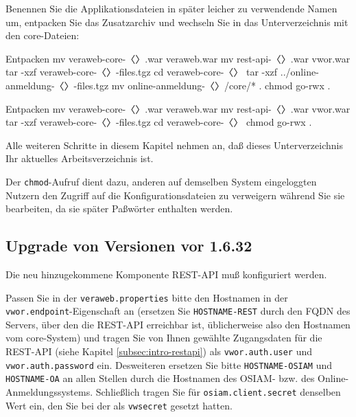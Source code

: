 \begin{minipage}{\linewidth}
Benennen Sie die Applikationsdateien in später leicher zu
verwendende Namen um, entpacken Sie das Zusatzarchiv und
wechseln Sie in das Unterverzeichnis mit den core-Dateien:

\ifoa
\begin{lstdump}{Entpacken}
mv veraweb-core-〈\lstdumpesc{\vwiaverssw}〉.war veraweb.war
mv rest-api-〈\lstdumpesc{\vwiaverssw}〉.war vwor.war
tar -xzf veraweb-core-〈\lstdumpesc{\vwiaverssw}〉-files.tgz
cd veraweb-core-〈\lstdumpesc{\vwiaverssw}〉
tar -xzf ../online-anmeldung-〈\lstdumpesc{\vwiaverssw}〉-files.tgz
mv online-anmeldung-〈\lstdumpesc{\vwiaverssw}〉/core/* .
chmod go-rwx .
\end{lstdump}
\else%
\begin{lstdump}{Entpacken}
mv veraweb-core-〈\lstdumpesc{\vwiaverssw}〉.war veraweb.war
mv rest-api-〈\lstdumpesc{\vwiaverssw}〉.war vwor.war
tar -xzf veraweb-core-〈\lstdumpesc{\vwiaverssw}〉-files.tgz
cd veraweb-core-〈\lstdumpesc{\vwiaverssw}〉
chmod go-rwx .
\end{lstdump}
\fi%
\end{minipage}

Alle weiteren Schritte in diesem Kapitel nehmen an, daß dieses
Unterverzeichnis Ihr aktuelles Arbeitsverzeichnis ist.

Der \texttt{chmod}-Aufruf dient dazu, anderen auf demselben System
eingeloggten Nutzern den Zugriff auf die Konfigurationsdateien zu
verweigern während Sie sie bearbeiten, da sie später Paßwörter
enthalten werden.

\subsection{Upgrade von Versionen vor 1.6.32}\label{subsec:upgrade-1632}

Die neu hinzugekommene Komponente REST-API muß konfiguriert werden.

Passen Sie in der \texttt{veraweb.properties} bitte den Hostnamen
in der \texttt{vwor.endpoint}-Eigenschaft an (ersetzen Sie
\texttt{HOSTNAME-REST} durch den FQDN des Servers, über den die
REST-API erreichbar ist, üblicherweise also den Hostnamen vom
core-System) und tragen Sie von Ihnen gewählte Zugangsdaten für
die REST-API (siehe Kapitel \ref{subsec:intro-restapi}) als
\texttt{vwor.auth.user} und \texttt{vwor.auth.password} ein.
\ifoa
Desweiteren ersetzen Sie bitte \texttt{HOSTNAME-OSIAM} und
\texttt{HOSTNAME-OA} an allen Stellen durch die Hostnamen
des OSIAM- bzw. des Online-Anmeldungssystems. Schließlich
tragen Sie für \texttt{osiam.client.secret} denselben Wert
ein, den Sie bei der
als \texttt{vwsecret} gesetzt hatten.
\fi%

